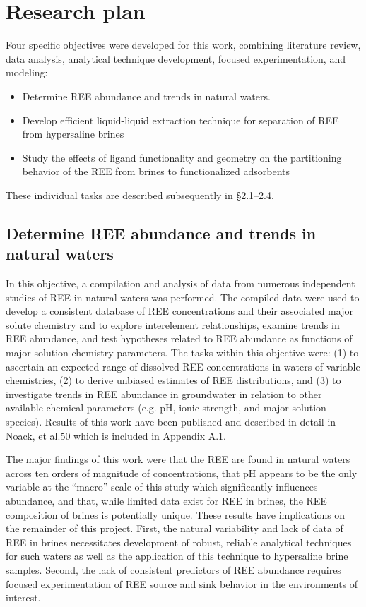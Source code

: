 \chapter{Research plan}
\vspace{-1cm}

Four specific objectives were developed for this work, combining literature review, data analysis, analytical technique development, focused experimentation, and modeling:

\begin{itemize}
	\item Determine REE abundance and trends in natural waters.
	\item	Develop efficient liquid-liquid extraction technique for separation of REE from hypersaline brines
	\item Study the effects of ligand functionality and geometry on the partitioning behavior of the REE from brines to functionalized adsorbents
\end{itemize}

These individual tasks are described subsequently in \S 2.1--2.4.

\section{Determine REE abundance and trends in natural waters}

In this objective, a compilation and analysis of data from numerous independent studies of REE in natural waters was performed.
The compiled data were used to develop a consistent database of REE concentrations and their associated major solute chemistry and to explore interelement relationships, examine trends in REE abundance, and test hypotheses related to REE abundance as functions of major solution chemistry parameters.
The tasks within this objective were: (1) to ascertain an expected range of dissolved REE concentrations in waters of variable chemistries, (2) to derive unbiased estimates of REE distributions, and (3) to investigate trends in REE abundance in groundwater in relation to other available chemical parameters (e.g. pH, ionic strength, and major solution species).
Results of this work have been published and described in detail in Noack, et al.50 which is included in Appendix A.1.

The major findings of this work were that the REE are found in natural waters across ten orders of magnitude of concentrations, that pH appears to be the only variable at the ``macro'' scale of this study which significantly influences abundance, and that, while limited data exist for REE in brines, the REE composition of brines is potentially unique.
These results have implications on the remainder of this project.
First, the natural variability and lack of data of REE in brines necessitates development of robust, reliable analytical techniques for such waters as well as the application of this technique to hypersaline brine samples.
Second, the lack of consistent predictors of REE abundance requires focused experimentation of REE source and sink behavior in the environments of interest.

